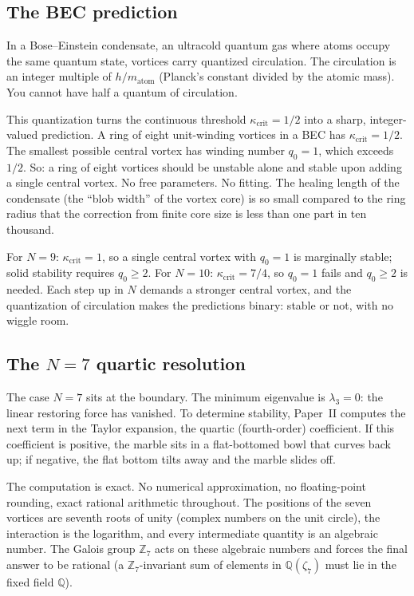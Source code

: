 \subsection*{The BEC prediction}

In a Bose--Einstein condensate, an ultracold quantum gas where atoms
occupy the same quantum state, vortices carry quantized circulation.
The circulation is an integer multiple of $h/m_{\mathrm{atom}}$
(Planck's constant divided by the atomic mass). You cannot have half a
quantum of circulation.

This quantization turns the continuous threshold
$\kappa_{\mathrm{crit}} = 1/2$ into a sharp, integer-valued prediction.
A ring of eight unit-winding vortices in a BEC has
$\kappa_{\mathrm{crit}} = 1/2$. The smallest possible central vortex
has winding number $q_0 = 1$, which exceeds $1/2$. So: a ring of eight
vortices should be unstable alone and stable upon adding a single central
vortex. No free parameters. No fitting. The healing length of the
condensate (the ``blob width'' of the vortex core) is so small compared
to the ring radius that the correction from finite core size is less
than one part in ten thousand.

For $N = 9$: $\kappa_{\mathrm{crit}} = 1$, so a single central vortex
with $q_0 = 1$ is marginally stable; solid stability requires $q_0 \ge 2$.
For $N = 10$: $\kappa_{\mathrm{crit}} = 7/4$, so $q_0 = 1$ fails and
$q_0 \ge 2$ is needed. Each step up in $N$ demands a stronger
central vortex, and the quantization of circulation makes the
predictions binary: stable or not, with no wiggle room.

\subsection*{The $N = 7$ quartic resolution}

The case $N = 7$ sits at the boundary. The minimum eigenvalue is
$\lambda_3 = 0$: the linear restoring force has vanished. To determine
stability, Paper~II computes the next term in the Taylor expansion, the
quartic (fourth-order) coefficient. If this coefficient is positive,
the marble sits in a flat-bottomed bowl that curves back up; if
negative, the flat bottom tilts away and the marble slides off.

The computation is exact. No numerical approximation, no floating-point
rounding, exact rational arithmetic throughout. The positions of the
seven vortices are seventh roots of unity (complex numbers on the unit
circle), the interaction is the logarithm, and every intermediate
quantity is an algebraic number. The Galois group $\mathbb{Z}_7$ acts on
these algebraic numbers and forces the final answer to be rational (a
$\mathbb{Z}_7$-invariant sum of elements in $\mathbb{Q}(\zeta_7)$
must lie in the fixed field $\mathbb{Q}$).

